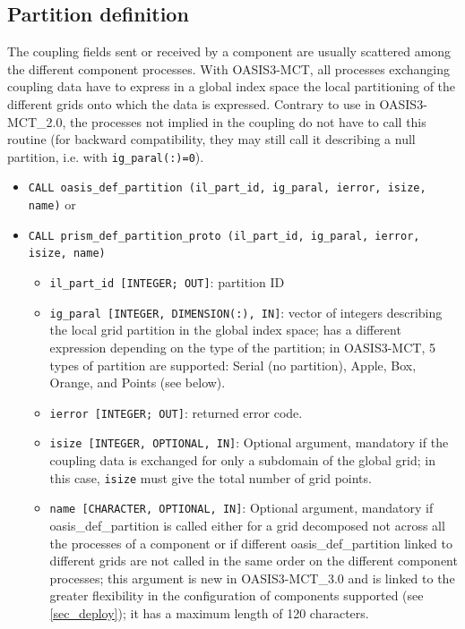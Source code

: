 \subsection{Partition definition}
\label{subsubsec_Partition}

The coupling fields sent or received by a component are usually
scattered among the different component processes. With OASIS3-MCT,
all processes exchanging coupling data have to express in a global index space the local
partitioning of the different grids onto which the data is expressed.
Contrary to use in OASIS3-MCT\_2.0, the processes not implied in the
coupling do not have to call this routine (for backward compatibility,
they may still call it describing a null partition, i.e. with {\tt ig\_paral(:)=0}).

\begin{itemize}

  \vspace{0.2cm}
\item {\tt CALL oasis\_def\_partition (il\_part\_id, ig\_paral,
    ierror, isize, name)} or
\item {\tt CALL prism\_def\_partition\_proto (il\_part\_id, ig\_paral,
    ierror, isize, name)}

  \begin{itemize}
  \item {\tt il\_part\_id [INTEGER; OUT]}: partition ID
  \item {\tt ig\_paral [INTEGER, DIMENSION(:), IN]}: vector of
    integers describing the local grid partition in the global index space;
    has a different expression depending on the type of the partition;
    in OASIS3-MCT, 5 types of partition are supported: Serial (no
    partition), Apple, Box, Orange, and Points (see below).
  \item {\tt ierror [INTEGER; OUT]}: returned error code.
  \item {\tt isize [INTEGER, OPTIONAL, IN]}: Optional argument, mandatory
    if the coupling data is exchanged for only a subdomain of the
    global grid; in this case, {\tt isize} must give the total number of grid points.

  \item {\tt name [CHARACTER, OPTIONAL, IN]}: Optional argument,
    mandatory if oasis\_def\_partition is called either for a grid
    decomposed not across all the processes of a component or if
    different oasis\_def\_partition linked to different grids are not
    called in the same order on the different component processes;
    this argument is new in OASIS3-MCT\_3.0 and is linked to the
    greater flexibility in the configuration of components supported
    (see \ref{sec_deploy}); it has a maximum length of 120 characters. 
  \end{itemize}
\end{itemize}

